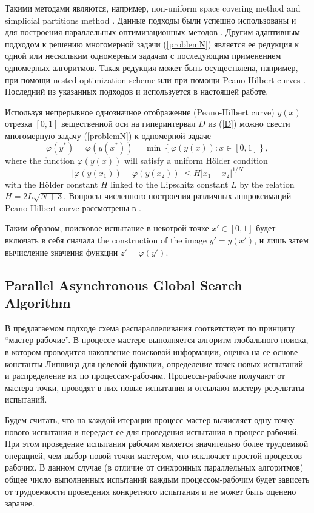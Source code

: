 \documentclass{svproc}
\begin{document}
Такими методами являются, например, non-uniform space covering method \cite{Evtushenko2013} and simplicial partitions method \cite{Zilinskas2010}. Данные подходы были успешно использованы и для построения параллельных оптимизационных методов \cite{Evtushenko2009,Paulavicius2011}. Другим адаптивным подходом к решению многомерной задачи (\ref{problemN}) является ее редукция к одной или нескольким одномерным задачам с последующим применением одномерных алгоритмов. Такая редукция может быть осуществлена, например, при помощи nested optimization scheme \cite{Grishagin2018} или при помощи Peano-Hilbert curves \cite{Barkalov2018}. Последний из указанных подходов и используется в настоящей работе.

Используя непрерывное однозначное отображение (Peano-Hilbert curve) $y(x)$ отрезка $[0,1]$ вещественной оси на гиперинтервал $D$ из (\ref{D}) можно свести многомерную задачу (\ref{problemN}) к одномерной задаче
\[
\varphi(y^\ast)=\varphi(y(x^\ast))=\min{\left\{\varphi(y(x)): x\in[0,1]\right\}},
\]
where the function $\varphi(y(x))$ will satisfy a uniform H{\"o}lder condition
\[
\left|\varphi(y(x_1))-\varphi(y(x_2))\right|\leq H\left|x_1-x_2\right|^{1/N}
\]
with the H{\"o}lder constant $H$ linked to the Lipschitz constant $L$ by the relation $ H=2 L \sqrt{N+3}$.
Вопросы численного построения различных аппроксимаций Peano-Hilbert curve рассмотрены в \cite{Strongin2000,Sergeyev2013}.

Таким образом, поисковое испытание в некотрой точке $x'\in[0,1]$ будет включать в себя сначала the construction of the image $y'=y(x')$, и лишь затем вычисление значения функции $ z' = \varphi(y')$.

\subsection{Parallel Asynchronous Global Search Algorithm}

В предлагаемом подходе схема распараллеливания соответствует по принципу ``мастер-рабочие''. В процессе-мастере выполняется алгоритм глобального поиска, в котором проводится накопление поисковой информации, оценка на ее основе константы Липшица для целевой функции, определение точек новых испытаний и распределение их по процессам-рабочим. Процессы-рабочие получают от мастера точки, проводят в них новые испытания и отсылают мастеру результаты испытаний. 

Будем считать, что на каждой итерации процесс-мастер вычисляет одну точку нового испытания и передает ее для проведения испытания в процесс-рабочий. При этом проведение испытания рабочим является значительно более трудоемкой операцией, чем выбор новой точки мастером, что исключает простой процессов-рабочих. 
В данном случае (в отличие от синхронных параллельных алгоритмов) общее число выполненных испытаний каждым процессом-рабочим будет зависеть от трудоемкости проведения конкретного испытания и не может быть оценено заранее.
\end{document}

